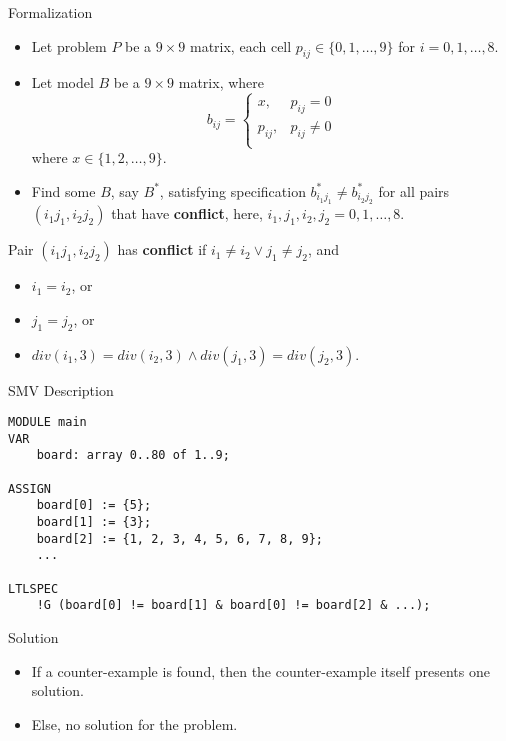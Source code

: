 \documentclass[11pt]{beamer}
\renewcommand{\r}{\alert}
\theoremstyle{definition}
\begin{document}
\begin{frame}{Formalization}
    \begin{itemize}
        \item Let \r{problem} $P$ be a $9 \times 9$ matrix, each cell $p_{ij} \in \{0, 1, \ldots, 9\}$ for $i=0,1,\ldots,8$.
        \item Let \r{model} $B$ be a $9 \times 9$ matrix, where $$b_{ij} = \left\{
            \begin{array}{ll}
                x, & p_{ij}=0 \\
                p_{ij}, & p_{ij} \not=0 \\
            \end{array}
        \right.$$ where $x \in \{1, 2, \dots, 9\}$.
        \item Find some $B$, say $B^*$, satisfying \r{specification} $b_{i_1 j_1}^* \not= b_{i_2 j_2}^*$ for all pairs $(i_1 j_1, i_2 j_2)$ that have \textbf{conflict}, here, $i_1, j_1, i_2, j_2=0,1,\ldots,8$.
    \end{itemize}
    \pause
    \begin{definition}
        Pair $(i_1 j_1, i_2 j_2)$ has \textbf{conflict} if $i_1 \not= i_2 \vee j_1 \not= j_2$, and
        \begin{itemize}
            \item $i_1 = i_2$, or
            \item $j_1 = j_2$, or
            \item $div(i_1, 3) = div(i_2, 3) \wedge div(j_1, 3) = div(j_2, 3)$.
        \end{itemize}
    \end{definition}
\end{frame}

\begin{frame}[fragile]{SMV Description}
    \begin{lstlisting}
MODULE main
VAR
    board: array 0..80 of 1..9;

ASSIGN
    board[0] := {5};
    board[1] := {3};
    board[2] := {1, 2, 3, 4, 5, 6, 7, 8, 9};
    ...

LTLSPEC
    !G (board[0] != board[1] & board[0] != board[2] & ...);
    \end{lstlisting}
\end{frame}

\begin{frame}{Solution}
    \begin{itemize}
        \item If a counter-example is found, then the counter-example itself presents one solution.
        \item Else, no solution for the problem.
    \end{itemize}
\end{frame}
\end{document}
